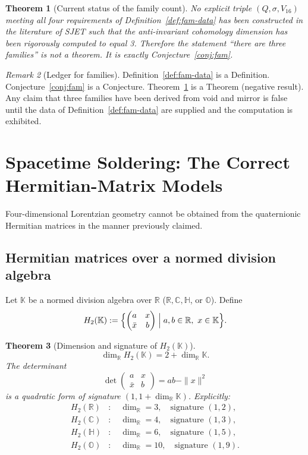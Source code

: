\documentclass[11pt]{article}
\theoremstyle{plain}
\newtheorem{theorem}{Theorem}[section]
\theoremstyle{definition}
\theoremstyle{remark}
\newtheorem{remark}[theorem]{Remark}
\numberwithin{equation}{section}
\newcommand{\R}{\mathbb{R}}
\newcommand{\C}{\mathbb{C}}
\newcommand{\Quat}{\mathbb{H}}
\newcommand{\Oct}{\mathbb{O}}
\begin{document}
\begin{theorem}[Current status of the family count]\label{thm:fam-status}
No explicit triple $(Q,\sigma,V_{16})$ meeting all four requirements of Definition~\ref{def:fam-data} has been constructed in the literature of SJET such that the anti-invariant cohomology dimension has been rigorously computed to equal 3. Therefore the statement ``there are three families'' is not a theorem. It is exactly Conjecture~\ref{conj:fam}.
\end{theorem}

\begin{remark}[Ledger for families]
Definition~\ref{def:fam-data} is a Definition. Conjecture~\ref{conj:fam} is a Conjecture. Theorem~\ref{thm:fam-status} is a Theorem (negative result). Any claim that three families have been derived from void and mirror is false until the data of Definition~\ref{def:fam-data} are supplied and the computation is exhibited.
\end{remark}

\section{Spacetime Soldering: The Correct Hermitian-Matrix Models}
\label{sec:soldering}

Four-dimensional Lorentzian geometry cannot be obtained from the quaternionic Hermitian matrices in the manner previously claimed.

\subsection{Hermitian matrices over a normed division algebra}

Let $\mathbb{K}$ be a normed division algebra over $\R$ ($\R,\C,\Quat$, or $\Oct$). Define
\[
H_2(\mathbb{K}) := \Bigl\{ \begin{pmatrix} a & x \\ \bar x & b \end{pmatrix} \Bigm| a,b\in\R,\ x\in\mathbb{K} \Bigr\}.
\]

\begin{theorem}[Dimension and signature of $H_2(\mathbb{K})$]\label{thm:h2k}
\[
\dim_{\R} H_2(\mathbb{K}) = 2 + \dim_{\R}\mathbb{K}.
\]
The determinant
\[
\det\begin{pmatrix} a & x \\ \bar x & b \end{pmatrix} = ab - \|x\|^2
\]
is a quadratic form of signature $(1,1+\dim_{\R}\mathbb{K})$. Explicitly:
\begin{align*}
H_2(\R)  &: \quad \dim_{\R}=3,\quad \text{signature }(1,2), \\
H_2(\C)  &: \quad \dim_{\R}=4,\quad \text{signature }(1,3), \\
H_2(\Quat)&: \quad \dim_{\R}=6,\quad \text{signature }(1,5), \\
H_2(\Oct) &: \quad \dim_{\R}=10,\quad \text{signature }(1,9).
\end{align*}
\end{theorem}
\end{document}
